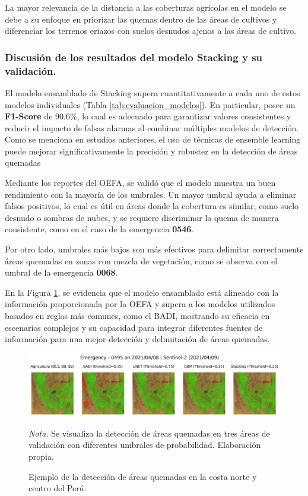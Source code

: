 La mayor relevancia de la distancia a las coberturas agrícolas en el modelo se debe a su enfoque en priorizar las quemas dentro de las áreas de cultivos y diferenciar los terrenos eriazos con suelos desnudos ajenos a las áreas de cultivo.


\subsubsection{Discusión de los resultados del modelo Stacking y su validación.}

El modelo ensamblado de Stacking supera cuantitativamente a cada uno de estos modelos individuales (Tabla \ref{tab:evaluacion_modelos}). En particular, posee un \textbf{F1-Score} de $90.6\%$, lo cual es adecuado para garantizar valores consistentes y reducir el impacto de falsas alarmas al combinar múltiples 
modelos de detección. Como se menciona en estudios anteriores, el uso de técnicas de ensemble learning puede mejorar significativamente la precisión y robustez en la detección de áreas quemadas \citep{lee_machine_2022}

Mediante los reportes del OEFA, se validó que el modelo muestra un buen rendimiento con la mayoría de los umbrales. Un mayor umbral ayuda a eliminar falsos positivos, lo cual es útil en áreas donde la cobertura es similar, como suelo desnudo o sombras de nubes, 
y se requiere discriminar la quema de manera consistente, como en el caso de la emergencia \textbf{0546}. 

Por otro lado, umbrales más bajos son más efectivos para delimitar correctamente áreas quemadas en zonas con mezcla de vegetación, 
como se observa con el umbral de la emergencia \textbf{0068}.

En la Figura \ref{fig:umbral}, se evidencia que el modelo ensamblado está alineado con la información proporcionada por la OEFA y supera a los modelos utilizados basados en reglas más comunes, como el BADI, mostrando su eficacia en escenarios complejos y su capacidad 
para integrar diferentes fuentes de información para una mejor detección y delimitación de áreas quemadas.

\begin{figure}[H]
    \centering
    \caption{Ejemplo de la detección de áreas quemadas en la costa norte y centro del Perú.}
    \includegraphics[width=1.01\textwidth]{img/8_capitulo6/0495.png}
    \label{fig:umbral}
    \begin{flushleft}
        \vspace{-\baselineskip}
        \textit{Nota.} Se visualiza la detección de áreas quemadas en tres áreas de validación con diferentes umbrales de probabilidad. Elaboración propia.
        \vspace{-\baselineskip}
    \end{flushleft}
\end{figure}

